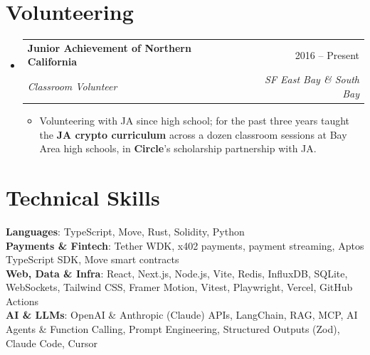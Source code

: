 \documentclass[letterpaper,9pt]{extarticle}
\makeatletter
\newcommand{\resumeItem}[1]{
  \item\small{
    {#1\vspace{-2pt}}
  }
}
\newcommand{\resumeSubheading}[4]{
  \vspace{-2pt}\item
    \begin{tabular*}{0.97\textwidth}[t]{l@{\extracolsep{\fill}}r}
      \textbf{#1} & #2 \\
      \textit{\small#3} & \textit{\small #4} \\
    \end{tabular*}\vspace{-7pt}
}
\newcommand{\resumeSubHeadingListStart}{\begin{itemize}[leftmargin=0.15in, label={}]}
\newcommand{\resumeSubHeadingListEnd}{\end{itemize}}
\newcommand{\resumeItemListStart}{\begin{itemize}}
\newcommand{\resumeItemListEnd}{\end{itemize}\vspace{-5pt}}
\makeatother
\begin{document}
\section{Volunteering}
  \resumeSubHeadingListStart
    \resumeSubheading
      {Junior Achievement of Northern California}{2016 -- Present}
      {Classroom Volunteer}{SF East Bay \& South Bay}
      \resumeItemListStart
        \resumeItem{Volunteering with JA since high school; for the past three years taught the \textbf{JA crypto curriculum} across a dozen classroom sessions at Bay Area high schools, in \textbf{Circle}'s scholarship partnership with JA.}
      \resumeItemListEnd
  \resumeSubHeadingListEnd

\section{Technical Skills}
 \begin{itemize}[leftmargin=0.15in, label={}]
    \small{\item{
     \textbf{Languages}{: TypeScript, Move, Rust, Solidity, Python} \\
     \textbf{Payments \& Fintech}{: Tether WDK, x402 payments, payment streaming, Aptos TypeScript SDK, Move smart contracts} \\
     \textbf{Web, Data \& Infra}{: React, Next.js, Node.js, Vite, Redis, InfluxDB, SQLite, WebSockets, Tailwind CSS, Framer Motion, Vitest, Playwright, Vercel, GitHub Actions} \\
     \textbf{AI \& LLMs}{: OpenAI \& Anthropic (Claude) APIs, LangChain, RAG, MCP, AI Agents \& Function Calling, Prompt Engineering, Structured Outputs (Zod), Claude Code, Cursor}
    }}
 \end{itemize}
\end{document}
